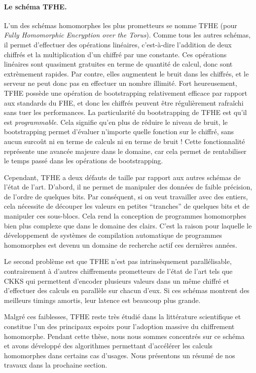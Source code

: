 \paragraph{Le schéma \gls{TFHE}.}
L'un des schémas homomorphes les plus prometteurs se nomme \gls{TFHE} \cite{JC:CGGI20} (pour \textit{Fully Homomorphic Encryption over the Torus}). Comme tous les autres schémas, il permet d'effectuer des opérations linéaires, c'est-à-dire l'addition de deux chiffrés et la multiplication d'un chiffré par une constante. Ces opérations linéaires sont quasiment gratuites en terme de quantité de calcul, donc sont extrèmement rapides. Par contre, elles augmentent le bruit dans les chiffrés, et le serveur ne peut donc pas en effectuer un nombre illimité. Fort heureusement, \gls{TFHE} possède une opération de bootstrapping relativement efficace par rapport aux standards du \gls{FHE}, et donc les chiffrés peuvent être régulièrement rafraîchi sans tuer les performances. 
La particularité du bootstrapping de \gls{TFHE} est qu'il est \textit{programmable}. Cela signifie qu'en plus de réduire le niveau de bruit, le bootstrapping permet d'évaluer n'importe quelle fonction sur le chiffré, sans aucun surcoût ni en terme de calculs ni en terme de bruit ! Cette fonctionnalité représente une avancée majeure dans le domaine, car cela permet de rentabiliser le temps passé dans les opérations de bootstrapping.

Cependant, \gls{TFHE} a deux défauts de taille par rapport aux autres schémas de l'état de l'art. D'abord, il ne permet de manipuler des données de faible précision, de l'ordre de quelques bits. Par conséquent, si on veut travailler avec des entiers, cela nécessite de découper les valeurs en petites ``tranches'' de quelques bits et de manipuler ces sous-blocs. Cela rend la conception de programmes homomorphes bien plus complexe que dans le domaine des clairs. C'est la raison pour laquelle le développement de systèmes de compilation automatique de programmes homomorphes est devenu un domaine de recherche actif ces dernières années.

Le second problème est que \gls{TFHE} n'est pas intrinsèquement parallélisable, contrairement à d'autres chiffrements prometteurs de l'état de l'art tels que CKKS \cite{AC:CKKS17} qui permettent d'encoder plusieurs valeurs dans un même chiffré et d'effectuer des calculs en parallèle sur chacun d'eux. Si ces schémas montrent des meilleurs timings amortis, leur latence est beaucoup plus grande.


Malgré ces faiblesses, \gls{TFHE} reste très étudié dans la littérature scientifique et constitue l'un des principaux espoirs pour l'adoption massive du chiffrement homomorphe. Pendant cette thèse, nous nous sommes concentrés sur ce schéma et avons développé des algorithmes permettant d'accélérer les calculs homomorphes dans certains cas d'usages. Nous présentons un résumé de nos travaux dans la prochaine section.




